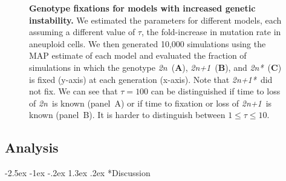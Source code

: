 \documentclass[12pt]{extarticle}
\makeatletter
\renewcommand\section{\@startsection {section}{1}{\z@}%
     {-2.5ex \@plus -1ex \@minus -.2ex}%
     {1.3ex \@plus.2ex}%
    {\Large\bfseries}}
\newcommand{\euwt}{\emph{2n}}
\newcommand{\anwt}{\emph{2n+1}}
\newcommand{\eumt}{\emph{2n*}}
\newcommand{\anmt}{\emph{2n+1*}}
\makeatother
\begin{document}
\begin{figure}[p]
\begin{subfigure}{0.75\textwidth}
  \end{subfigure}
   \caption{
    \textbf{Genotype fixations for models with increased genetic instability.} We estimated the parameters for different models, each assuming a different value of $\tau$, the fold-increase in mutation rate in aneuploid cells. We then generated 10,000 simulations using the MAP estimate of each model and evaluated the fraction of simulations in which the genotype \euwt\ (\textbf{A}), \anwt\ (\textbf{B}), and \eumt\ (\textbf{C}) is fixed (y-axis) at each generation (x-axis). Note that \anmt\ did not fix. We can see that $\tau=100$ can be distinguished if time to loss of \euwt\ is known (panel~A) or if time to fixation or loss of \anwt\ is known (panel~B). It is harder to distinguish between $1\leq \tau \leq10$.
  }
  \label{fig:tau-plots}
\end{figure}


\pagebreak
\subsection*{Analysis}




\section*{Discussion}
\end{document}
